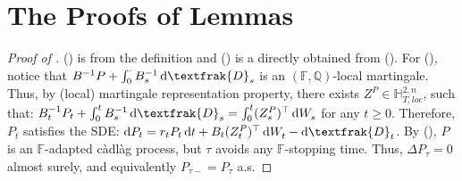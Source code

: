 \documentclass[a4paper, 11pt]{article}              %
\numberwithin{equation}{section}
\theoremstyle{plain}
\newcommand{\1}{\mathds{1}}
\newcommand{\frD}{\textfrak{D}}
\newcommand{\dsF}{\mathbb{F}}
\newcommand{\dsH}{\mathbb{H}}
\newcommand{\dsQ}{\mathbb{Q}}
\theoremstyle{plain}
\theoremstyle{definition}
\theoremstyle{plain}
\newcommand*\df{\mathop{}\!\mathrm{d}}
\newcommand{\rom}[1]{\lowercase\expandafter{\romannumeral #1\relax}}
\begin{document}
\section{The Proofs of Lemmas} 
\label{app:lemmas}
\begin{proof}[Proof of ]
  (\rom{1}) is from the definition and (\rom{2}) is a directly obtained from
  (\rom{1}).  For (\rom{3}), notice that
  $B^{-1}P + \int_{0}^{\cdot}B^{-1}_s\df \frD_s$ is an $(\dsF, \dsQ)$-local
  martingale. Thus, by (local) martingale representation property, there exists
  $Z^P \in \dsH^{2, n}_{T, loc}$, such that:
$B_t^{-1}P_t + \int_{0}^{t}B^{-1}_s\df \frD_s = \int_{0}^{t}(Z^P_s)^{\top}\df W^{}_s$
for any $t \geq0$.
Therefore, $P_t$ satisfies the SDE:
  $\df P_t = r_tP_t\df t + B_t(Z^P_t)^{\top}\df W^{}_t - \df \frD_t$.
By (\rom{3}), $P$ is an $\dsF$-adapted c\`adl\`ag process, but $\tau$ avoids any
$\dsF$-stopping time. Thus, $\Delta P_{\tau}=0$ almost surely, and equivalently $P_{\tau-}
= P_{\tau}$ a.s.        
\end{proof}
\end{document}
